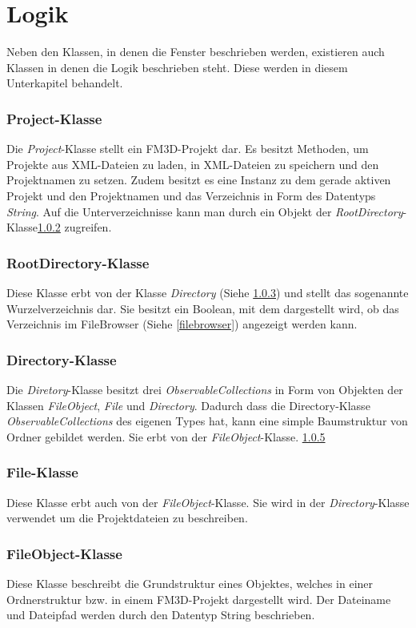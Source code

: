 \section{Logik}
Neben den Klassen, in denen die Fenster beschrieben werden, existieren auch Klassen in denen die Logik beschrieben steht. Diese werden in diesem Unterkapitel behandelt.

\subsubsection{Project-Klasse}
Die \textit{Project}-Klasse stellt ein FM3D-Projekt dar. Es besitzt Methoden, um Projekte aus \ac{XML}-Dateien zu laden, in \ac{XML}-Dateien zu speichern und den Projektnamen zu setzen. Zudem besitzt es eine Instanz zu dem gerade aktiven Projekt und den Projektnamen und das Verzeichnis in Form des Datentyps \textit{String}. Auf die Unterverzeichnisse kann man durch ein Objekt der \textit{RootDirectory}-Klasse\cref{rootdirectory} zugreifen.

\subsubsection{RootDirectory-Klasse}
\label{rootdirectory}
Diese Klasse erbt von der Klasse \textit{Directory} (Siehe \cref{directory}) und stellt das sogenannte Wurzelverzeichnis dar. Sie besitzt ein Boolean, mit dem dargestellt wird, ob das Verzeichnis im FileBrowser (Siehe \cref{filebrowser}) angezeigt werden kann.

\subsubsection{Directory-Klasse}
\label{directory}
Die \textit{Diretory}-Klasse besitzt drei \textit{ObservableCollections} in Form von Objekten der Klassen \textit{FileObject}, \textit{File} und \textit{Directory}. Dadurch dass die Directory-Klasse \textit{ObservableCollections} des eigenen Types hat, kann eine simple Baumstruktur von Ordner gebildet werden. Sie erbt von der \textit{FileObject}-Klasse. \cref{fileobject}

\subsubsection{File-Klasse}
Diese Klasse erbt auch von der \textit{FileObject}-Klasse. Sie wird in der \textit{Directory}-Klasse verwendet um die Projektdateien zu beschreiben.

\subsubsection{FileObject-Klasse}
\label{fileobject}
Diese Klasse beschreibt die Grundstruktur eines Objektes, welches in einer Ordnerstruktur bzw. in einem FM3D-Projekt dargestellt wird. Der Dateiname und Dateipfad werden durch den Datentyp String beschrieben.

